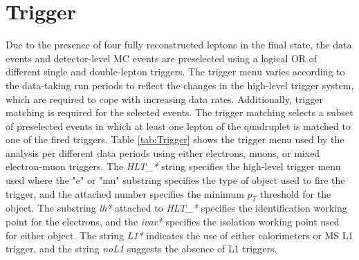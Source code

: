 \section{Trigger}
\label{sec:Trigger}

Due to the presence of four fully reconstructed leptons in the final state, the data events and detector-level MC events are preselected using a logical OR of different single and double-lepton triggers. The trigger menu varies according to the data-taking run periods to reflect the changes in the high-level trigger system, which are required to cope with increasing data rates. Additionally, trigger matching is required for the selected events. The trigger matching selects a subset of preselected events in which at least one lepton of the quadruplet is matched to one of the fired triggers. Table \ref{tab:Trigger} shows the trigger menu used by the analysis per different data periods using either electrons, muons, or mixed electron-muon triggers. The \textit{HLT\_*} string specifies the high-level trigger menu used where the "e" or "mu" substring specifies the type of object used to fire the trigger, and the attached number specifies the minimum $p_{T}$ threshold for the object. The substring \textit{lh*} attached to \textit{HLT\_*} specifies the identification working point for the electrons, and the \textit{ivar*} specifies the isolation working point used for either object. The string \textit{L1*} indicates the use of either calorimeters or MS L1 trigger, and the string \textit{noL1} suggests the absence of L1 triggers. 

